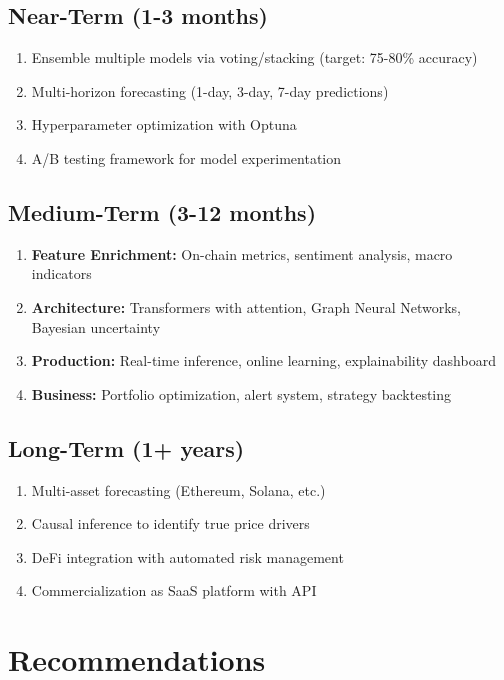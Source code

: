 \subsection{Near-Term (1-3 months)}
\begin{enumerate}
    \item Ensemble multiple models via voting/stacking (target: 75-80\% accuracy)
    \item Multi-horizon forecasting (1-day, 3-day, 7-day predictions)
    \item Hyperparameter optimization with Optuna
    \item A/B testing framework for model experimentation
\end{enumerate}

\subsection{Medium-Term (3-12 months)}
\begin{enumerate}
    \item \textbf{Feature Enrichment:} On-chain metrics, sentiment analysis, macro indicators
    \item \textbf{Architecture:} Transformers with attention, Graph Neural Networks, Bayesian uncertainty
    \item \textbf{Production:} Real-time inference, online learning, explainability dashboard
    \item \textbf{Business:} Portfolio optimization, alert system, strategy backtesting
\end{enumerate}

\subsection{Long-Term (1+ years)}
\begin{enumerate}
    \item Multi-asset forecasting (Ethereum, Solana, etc.)
    \item Causal inference to identify true price drivers
    \item DeFi integration with automated risk management
    \item Commercialization as SaaS platform with API
\end{enumerate}

\section{Recommendations}

